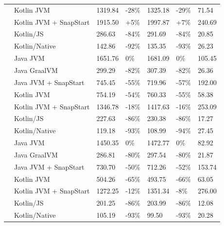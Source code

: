 \begin{table}[htbp]
\begin{tabular}{|>{\centering\arraybackslash}m{2cm}|l|p{1.5cm}|p{1.5cm}|p{1.5cm}|p{1.5cm}|p{1.5cm}|}
 & Kotlin JVM & 1319.84 & \mbox{-28\%} & 1325.18 & \mbox{-29\%} & 71.54 \\
 & Kotlin JVM + SnapStart & 1915.50 & \mbox{+5\%} & 1997.87 & \mbox{+7\%} & 240.69 \\
 & Kotlin/JS & 286.63 & \mbox{-84\%} & 291.69 & \mbox{-84\%} & 20.85 \\
 & Kotlin/Native & 142.86 & \mbox{-92\%} & 135.35 & \mbox{-93\%} & 26.23 \\
\midrule
\multirow{7}{*}{1024} & Java JVM & 1651.76 & \mbox{0\%} & 1681.09 & \mbox{0\%} & 105.45 \\
 & Java GraalVM & 299.29 & \mbox{-82\%} & 307.39 & \mbox{-82\%} & 26.36 \\
 & Java JVM + SnapStart & 745.45 & \mbox{-55\%} & 719.96 & \mbox{-57\%} & 192.00 \\
 & Kotlin JVM & 754.19 & \mbox{-54\%} & 760.33 & \mbox{-55\%} & 58.38 \\
 & Kotlin JVM + SnapStart & 1346.78 & \mbox{-18\%} & 1417.63 & \mbox{-16\%} & 253.09 \\
 & Kotlin/JS & 227.63 & \mbox{-86\%} & 230.38 & \mbox{-86\%} & 17.27 \\
 & Kotlin/Native & 119.18 & \mbox{-93\%} & 108.99 & \mbox{-94\%} & 27.45 \\
\midrule
\multirow{7}{*}{2048} & Java JVM & 1450.35 & \mbox{0\%} & 1472.77 & \mbox{0\%} & 82.92 \\
 & Java GraalVM & 286.81 & \mbox{-80\%} & 297.54 & \mbox{-80\%} & 21.87 \\
 & Java JVM + SnapStart & 730.70 & \mbox{-50\%} & 712.26 & \mbox{-52\%} & 153.74 \\
 & Kotlin JVM & 504.26 & \mbox{-65\%} & 493.75 & \mbox{-66\%} & 63.05 \\
 & Kotlin JVM + SnapStart & 1272.25 & \mbox{-12\%} & 1351.34 & \mbox{-8\%} & 276.00 \\
 & Kotlin/JS & 201.25 & \mbox{-86\%} & 203.99 & \mbox{-86\%} & 12.08 \\
 & Kotlin/Native & 105.19 & \mbox{-93\%} & 99.50 & \mbox{-93\%} & 20.28 \\
\bottomrule
\end{tabular}
\label{tab:cold_start_comparison}
\end{table}

